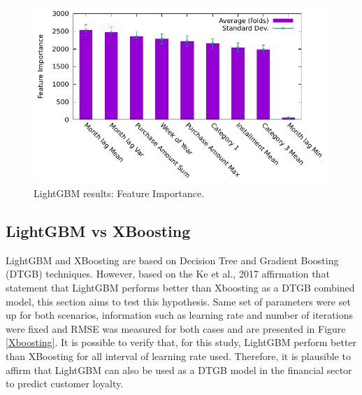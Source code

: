\documentclass[letterpaper, 10 pt, conference]{ieeeconf}  %
\begin{document}
\begin{figure}[thpb]
\centering
\includegraphics[scale=0.7]{Figures/Feature.pdf}
\caption{LightGBM results: Feature Importance.}
\label{feature_importance}
\end{figure}

\subsection{LightGBM vs XBoosting}
LightGBM and XBoosting are based on Decision Tree and Gradient Boosting (DTGB) techniques. However, based on the Ke et al., 2017 \cite{LGBM} affirmation that statement that LightGBM performs better than Xboosting as a DTGB combined model, this section aims to test this hypothesis. Same set of parameters were set up for both scenarios, information such as learning rate and number of iterations were fixed and RMSE was measured for both cases and are presented in Figure \ref{Xboosting}. It is possible to verify that, for this study, LightGBM perform better than XBoosting for all interval of learning rate used. Therefore, it is plausible to affirm that LightGBM can also be used as a DTGB model in the financial sector to predict customer loyalty.
\end{document}
